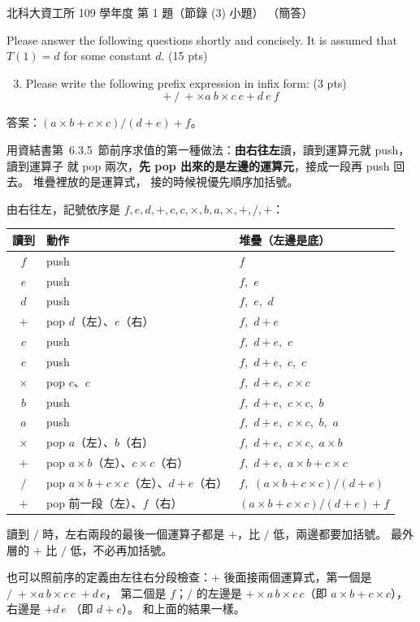 \begin{pastexam}[label={px:ntut-109-ci-01}]{北科大資工所 109 學年度 第 1 題（節錄 (3) 小題）}
（簡答）

Please answer the following questions shortly and concisely. It is assumed that $T(1)=d$ for some
constant $d$. (15 pts)
\begin{enumerate}[label=(\arabic*)]
\setcounter{enumi}{2}
\item Please write the following prefix expression in infix form: (3 pts)
\[+\ /\ +\times a\ b\times c\ c+d\ e\ f\]
\end{enumerate}
\end{pastexam}

\begin{pastsoln}
答案：$(a \times b + c \times c) / (d + e) + f$。

用資結書第~6.3.5~節前序求值的第一種做法：\textbf{由右往左}讀，讀到運算元就 push，讀到運算子
就 pop 兩次，\textbf{先 pop 出來的是左邊的運算元}，接成一段再 push 回去。 堆疊裡放的是運算式，
接的時候視優先順序加括號。

由右往左，記號依序是 $f, e, d, +, c, c, \times, b, a, \times, +, /, +$：
\begin{center}
\small
\begin{tabular}{cll}
\toprule
讀到 & 動作 & 堆疊（左邊是底） \\
\midrule
$f$ & push & $f$ \\
$e$ & push & $f$,\ $e$ \\
$d$ & push & $f$,\ $e$,\ $d$ \\
$+$ & pop $d$（左）、$e$（右） & $f$,\ $d + e$ \\
$c$ & push & $f$,\ $d + e$,\ $c$ \\
$c$ & push & $f$,\ $d + e$,\ $c$,\ $c$ \\
$\times$ & pop $c$、$c$ & $f$,\ $d + e$,\ $c \times c$ \\
$b$ & push & $f$,\ $d + e$,\ $c \times c$,\ $b$ \\
$a$ & push & $f$,\ $d + e$,\ $c \times c$,\ $b$,\ $a$ \\
$\times$ & pop $a$（左）、$b$（右） & $f$,\ $d + e$,\ $c \times c$,\ $a \times b$ \\
$+$ & pop $a \times b$（左）、$c \times c$（右） & $f$,\ $d + e$,\ $a \times b + c \times c$ \\
$/$ & pop $a \times b + c \times c$（左）、$d + e$（右） & $f$,\ $(a \times b + c \times c) / (d + e)$ \\
$+$ & pop 前一段（左）、$f$（右） & $(a \times b + c \times c) / (d + e) + f$ \\
\bottomrule
\end{tabular}
\end{center}

讀到 $/$ 時，左右兩段的最後一個運算子都是 $+$，比 $/$ 低，兩邊都要加括號。 最外層的 $+$ 比
$/$ 低，不必再加括號。

也可以照前序的定義由左往右分段檢查：$+$ 後面接兩個運算式，第一個是 $/\;+\times a\,b\times c\,c\;+d\,e$，
第二個是 $f$；$/$ 的左邊是 $+\times a\,b\times c\,c$（即 $a \times b + c \times c$），右邊是 $+d\,e$
（即 $d + e$）。 和上面的結果一樣。
\end{pastsoln}
